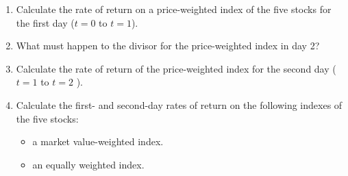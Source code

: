 \documentclass[11.5pt]{article}
\begin{document}
\begin{enumerate}[a]

\item Calculate the rate of return on a price-weighted index of the five stocks for the first day ($t = 0$ to $t = 1$).

\item What must happen to the divisor for the price-weighted index in day 2?

\item Calculate the rate of return of the price-weighted index for the second day ($t = 1$ to $t = 2$ ). \\

\item Calculate the first- and second-day rates of return on the following indexes of the five stocks:

\begin{itemize}
	\item a market value-weighted index.
	
	\item an equally weighted index. 
\end{itemize}
\end{enumerate}

%
%
%
%
%
%
%
%
%
%




\vspace{80pt}


\newpage
\end{document}
